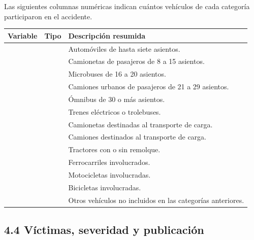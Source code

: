 \documentclass[11pt,letterpaper]{article}
\begin{document}
\begin{nota}
\small
Las siguientes columnas numéricas indican cuántos vehículos de cada categoría
participaron en el accidente.

\vspace{0.4em}
\begin{tabularx}{\textwidth}{L{3cm}L{1.45cm}Y}
    \toprule
    \textbf{Variable} & \textbf{Tipo} & \textbf{Descripción resumida} \\
    \midrule
     &  & Automóviles de hasta siete asientos. \\
     &  & Camionetas de pasajeros de 8 a 15 asientos. \\
     &  & Microbuses de 16 a 20 asientos. \\
     &  & Camiones urbanos de pasajeros de 21 a 29 asientos. \\
     &  & Ómnibus de 30 o más asientos. \\
     &  & Trenes eléctricos o trolebuses. \\
     &  & Camionetas destinadas al transporte de carga. \\
     &  & Camiones destinados al transporte de carga. \\
     &  & Tractores con o sin remolque. \\
     &  & Ferrocarriles involucrados. \\
     &  & Motocicletas involucradas. \\
     &  & Bicicletas involucradas. \\
     &  & Otros vehículos no incluidos en las categorías anteriores. \\
    \bottomrule
\end{tabularx}
\end{nota}

\subsection*{4.4 Víctimas, severidad y publicación}
\end{document}
